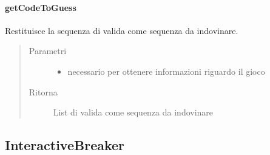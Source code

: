 \documentclass[letterpaper,10pt,italian,openany,oneside]{sphinxmanual}
\begin{document}
\paragraph{getCodeToGuess}
\label{\detokenize{source/it/unicam/cs/pa/mastermind/players/CodeMaker:getcodetoguess}}

\begin{fulllineitems}
\label{\detokenize{source/it/unicam/cs/pa/mastermind/players/CodeMaker:it.unicam.cs.pa.mastermind.players.CodeMaker.getCodeToGuess(InteractionView)}}
Restituisce la sequenza di  valida come sequenza da indovinare.
\begin{quote}\begin{description}
\item[{Parametri}] \leavevmode\begin{itemize}
\item {} 
 \textendash{} necessario per ottenere informazioni riguardo il gioco

\end{itemize}

\item[{Ritorna}] \leavevmode
List di  valida come sequenza da indovinare

\end{description}\end{quote}

\end{fulllineitems}



\subsection{InteractiveBreaker}
\label{\detokenize{source/it/unicam/cs/pa/mastermind/players/InteractiveBreaker:interactivebreaker}}\label{\detokenize{source/it/unicam/cs/pa/mastermind/players/InteractiveBreaker::doc}}
\end{document}
